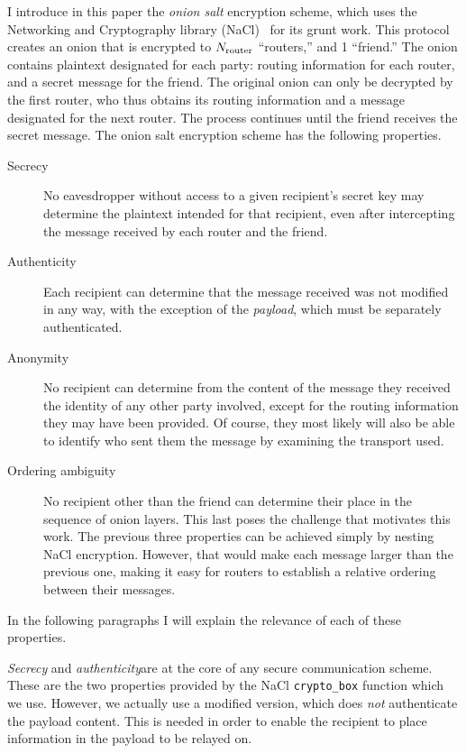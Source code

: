 \documentclass[letterpaper,twocolumn,amsmath,amssymb,pre,aps,10pt]{revtex4-1}
\begin{document}
I introduce in this paper the \emph{onion salt} encryption scheme,
which uses the Networking and Cryptography library
(NaCl)~\cite{bernstein2009cryptography} for its grunt work.  This
protocol creates an onion that is encrypted to $N_{\text{router}}$ ``routers,''
and 1 ``friend.''  The onion contains plaintext designated for each
party: routing information for each router, and a secret message for
the friend.  The original onion can only be decrypted by the first
router, who thus obtains its routing information and a message
designated for the next router.  The process continues until the
friend receives the secret message.  The onion salt encryption scheme
has the following properties.
\begin{description}
\item[Secrecy] No eavesdropper without access to a given recipient's
  secret key may determine the plaintext intended for that recipient,
  even after intercepting the message received by each router and the
  friend.
\item[Authenticity] Each recipient can determine that the message
  received was not modified in any way, with the exception of the
  \emph{payload}, which must be separately authenticated.
\item[Anonymity] No recipient can determine from the content of the
  message they received the identity of any other party involved,
  except for the routing information they may have been provided.  Of
  course, they most likely will also be able to identify who sent them
  the message by examining the transport used.
\item[Ordering ambiguity] No recipient other than the friend can determine
  their place in the sequence of onion layers.  This last poses the
  challenge that motivates this work.  The previous three properties
  can be achieved simply by nesting NaCl encryption.  However, that
  would make each message larger than the previous one, making it easy
  for routers to establish a relative ordering between their messages.
\end{description}
In the following paragraphs I will explain the relevance of each of
these properties.

\emph{Secrecy} and \emph{authenticity}are at the core of any secure
communication scheme.  These are the two properties provided by the
NaCl \verb!crypto_box! function which we use.  However, we actually
use a modified version, which does \emph{not} authenticate the payload
content.  This is needed in order to enable the recipient to place
information in the payload to be relayed on.
\end{document}
